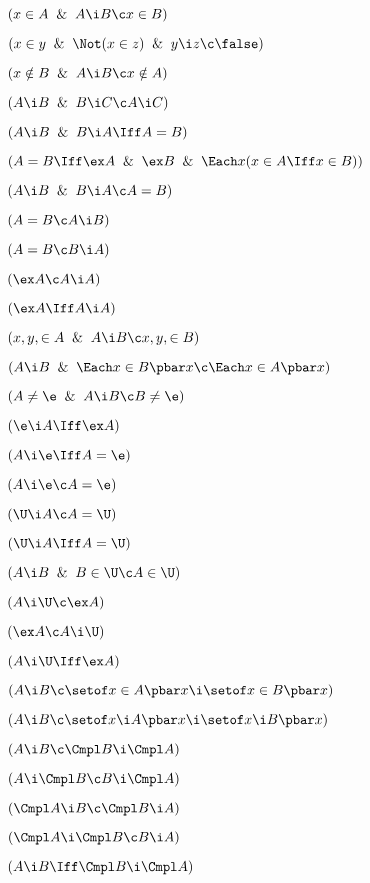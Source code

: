  $(x \in A \And A \i B \c x \in B)$

 $(x \in y \And \Not(x \in z) \And y \i z \c \false)$

 $(x \notin B \And A \i B \c x \notin A)$

 $(A \i B \And B \i C \c A \i C)$

 $(A \i B \And B \i A \Iff A = B)$

 $(A = B \Iff \ex A \And \ex B \And \Each x (x \in A \Iff x \in B))$

 $(A \i B \And B \i A \c A = B)$

 $(A = B \c A \i B)$

 $(A = B \c B \i A)$

 $(\ex A \c A \i A)$

 $(\ex A \Iff A \i A)$

  $(x,y,\in A \And A \i B \c x,y,\in B)$

 $(A\i B \And \Each x \in B \pbar x\c\Each x\in A\pbar x)$

 $(A\ne\e \And A \i B \c B\ne\e)$

 $(\e \i A \Iff \ex A)$

 $(A \i \e \Iff A = \e)$

 $(A \i \e \c A = \e)$

 $(\U \i A \c A = \U)$

 $(\U \i A \Iff A = \U)$

$(A \i B \And B \in \U \c A\in \U)$

 $(A \i \U \c \ex A)$

 $(\ex A\c A \i \U )$

 $(A \i \U \Iff \ex A)$

 $(A \i B \c \setof x \in A \pbar x \i \setof x \in B \pbar x)$

 $(A \i B \c \setof x \i A \pbar x \i \setof x \i B \pbar x)$

 $(A \i B \c \Cmpl B \i \Cmpl A)$

 $(A \i \Cmpl B \c B \i \Cmpl A)$

 $(\Cmpl A \i B \c \Cmpl B  \i A)$

 $(\Cmpl A \i \Cmpl B \c B \i A)$

 $(A \i B \Iff \Cmpl B \i \Cmpl A)$

